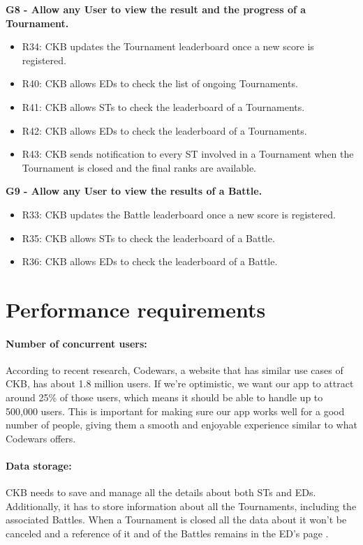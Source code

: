 \vspace{1.5cm}
\textbf{G8 - Allow any User to view the result and the progress of a Tournament.}\\
\begin{itemize}
    \item R34: CKB updates the Tournament leaderboard once a new score is registered.
    \item R40: CKB allows EDs to check the list of ongoing Tournaments.
    \item R41: CKB allows STs to check the leaderboard of a Tournaments.
    \item R42: CKB allows EDs to check the leaderboard of a Tournaments.
    \item R43: CKB sends notification to every ST involved in a Tournament when the Tournament is closed and the final ranks are available.
\end{itemize}


\vspace{1.5cm}
\textbf{G9 - Allow any User to view the results of a Battle.}\\
\begin{itemize}
    \item R33: CKB updates the Battle leaderboard once a new score is registered.
    \item R35: CKB allows STs to check the leaderboard of a Battle.
    \item R36: CKB allows EDs to check the leaderboard of a Battle.
\end{itemize}



\section{Performance requirements}
\label{sec:performance_requirements}%
\paragraph{Number of concurrent users:} According to recent research, Codewars, a website that has similar use cases of CKB, has about 1.8 million users. If we're optimistic, we want our app to attract around 25\% of those users, which means it should be able to handle up to 500,000 users. This is important for making sure our app works well for a good number of people, giving them a smooth and enjoyable experience similar to what Codewars offers.
\paragraph{Data storage:} CKB needs to save and manage all the details about both STs and EDs. Additionally, it has to store information about all the Tournaments, including the associated Battles. When a Tournament is closed all the data about it won’t be canceled and a reference of it and of the Battles remains in the ED’s page .
